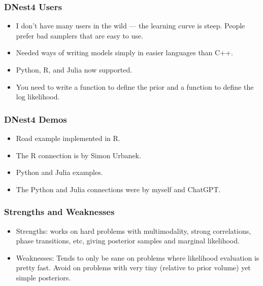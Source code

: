 \documentclass{beamer}
\begin{document}
\begin{frame}
\frametitle{DNest4 Users}
\begin{itemize}
\item I don't have many users in the wild --- the learning curve is steep.
People prefer bad samplers that are easy to use.\pause
\item Needed ways of writing models simply in easier languages than C++.\pause
\item Python, R, and Julia now supported.\pause
\item You need to write a function to define the prior and a function
to define the log likelihood.
\end{itemize}
\end{frame}

\begin{frame}
\frametitle{DNest4 Demos}
\begin{itemize}
\item Road example implemented in R.\pause
\item The R connection is by Simon Urbanek.\pause
\item Python and Julia examples.\pause
\item The Python and Julia connections were by myself and ChatGPT.
\end{itemize}
\end{frame}

\begin{frame}
\frametitle{Strengths and Weaknesses}
\begin{itemize}
\item Strengths:
works on hard problems with multimodality, strong correlations, phase
transitions, etc, giving posterior samples and marginal likelihood.\pause
\item Weaknesses: Tends to only be sane on problems where likelihood evaluation
is pretty fast. Avoid on problems with very tiny (relative to prior volume)
yet simple posteriors.
\end{itemize}

\end{frame}
\end{document}
